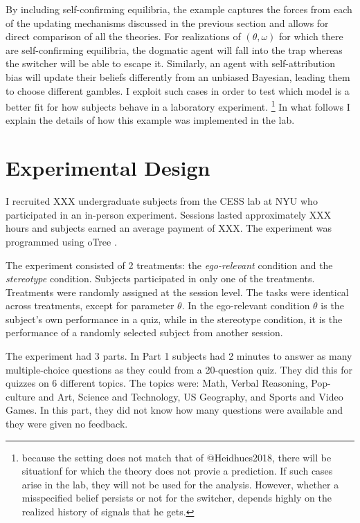 \documentclass[
  12pt,
]{article}
\begin{document}
By including self-confirming equilibria, the example captures the forces
from each of the updating mechanisms discussed in the previous section
and allows for direct comparison of all the theories. For realizations
of \((\theta, \omega)\) for which there are self-confirming equilibria,
the dogmatic agent will fall into the trap whereas the switcher will be
able to escape it. Similarly, an agent with self-attribution bias will
update their beliefs differently from an unbiased Bayesian, leading them
to choose different gambles. I exploit such cases in order to test which
model is a better fit for how subjects behave in a laboratory
experiment.
\footnote{because the setting does not match that of @Heidhues2018, there will be situationf for which the theory 
does not provie a prediction. If such cases arise in the lab, they will not be used for the analysis. However, whether a misspecified 
belief persists or not for the switcher, depends highly on the realized history of signals that he gets.}
In what follows I explain the details of how this example was
implemented in the lab.

\hypertarget{experimental-design}{%
\section{Experimental Design}\label{experimental-design}}

I recruited XXX undergraduate subjects from the CESS lab at NYU who
participated in an in-person experiment. Sessions lasted approximately
XXX hours and subjects earned an average payment of XXX. The experiment
was programmed using oTree \citep{chen2016otree}.

The experiment consisted of 2 treatments: the \emph{ego-relevant}
condition and the \emph{stereotype} condition. Subjects participated in
only one of the treatments. Treatments were randomly assigned at the
session level. The tasks were identical across treatments, except for
parameter \(\theta\). In the ego-relevant condition \(\theta\) is the
subject's own performance in a quiz, while in the stereotype condition,
it is the performance of a randomly selected subject from another
session.

The experiment had 3 parts. In Part 1 subjects had 2 minutes to answer
as many multiple-choice questions as they could from a 20-question quiz.
They did this for quizzes on 6 different topics. The topics were: Math,
Verbal Reasoning, Pop-culture and Art, Science and Technology, US
Geography, and Sports and Video Games. In this part, they did not know
how many questions were available and they were given no feedback.
\end{document}
